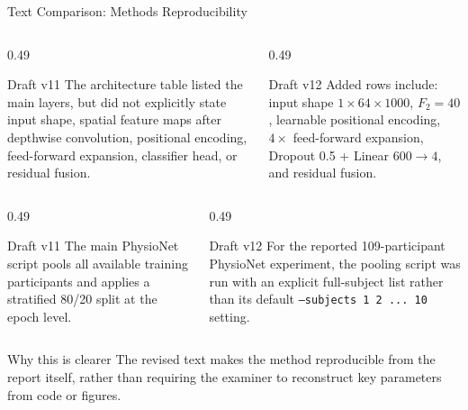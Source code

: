 \documentclass[UTF8,aspectratio=169,11pt]{ctexbeamer}
\begin{document}
\begin{frame}[t]{Text Comparison: Methods Reproducibility}
\scriptsize

    \begin{columns}[T,onlytextwidth]
        \begin{column}{0.49\textwidth}
            \begin{alertblock}{Draft v11}
                The architecture table listed the main layers, but did not explicitly state input shape, spatial feature maps after depthwise convolution, positional encoding, feed-forward expansion, classifier head, or residual fusion.
            \end{alertblock}
        \end{column}
        \begin{column}{0.49\textwidth}
            \begin{block}{Draft v12}
                Added rows include: input shape $1 \times 64 \times 1000$, $F_2 = 40$, learnable positional encoding, $4 \times$ feed-forward expansion, Dropout 0.5 + Linear $600 \rightarrow 4$, and residual fusion.
            \end{block}
        \end{column}
    \end{columns}

    \vspace{0.5em}

    \begin{columns}[T,onlytextwidth]
        \begin{column}{0.49\textwidth}
            \begin{alertblock}{Draft v11}
                The main PhysioNet script pools all available training participants and applies a stratified 80/20 split at the epoch level.
            \end{alertblock}
        \end{column}
        \begin{column}{0.49\textwidth}
            \begin{block}{Draft v12}
                For the reported 109-participant PhysioNet experiment, the pooling script was run with an explicit full-subject list rather than its default \texttt{--subjects 1 2 ... 10} setting.
            \end{block}
        \end{column}
    \end{columns}

    \vfill

    \begin{block}{Why this is clearer}
        The revised text makes the method reproducible from the report itself, rather than requiring the examiner to reconstruct key parameters from code or figures.
    \end{block}

\end{frame}
\end{document}
